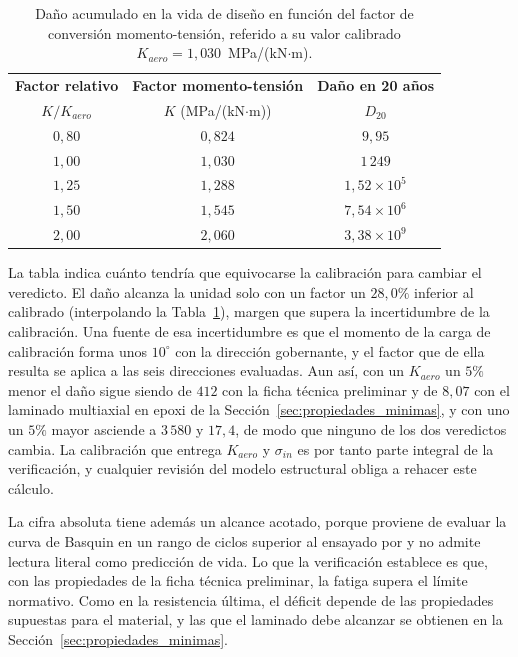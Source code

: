 \begin{table}[H]
    \centering
    \caption[Sensibilidad del daño acumulado a la calibración momento-tensión.]{Daño acumulado en la vida de diseño en función del factor de conversión momento-tensión, referido a su valor calibrado $K_{aero} = 1{,}030$~MPa/(kN$\cdot$m).}
    \label{tab:sensibilidad_fatiga}
    \begin{tabular}{ccc}
        \hline
        \textbf{Factor relativo} & \textbf{Factor momento-tensión} & \textbf{Daño en 20 años} \\
        $K/K_{aero}$ & $K$ (MPa/(kN$\cdot$m)) & $D_{20}$ \\
        \hline
        $0{,}80$ & $0{,}824$ & $9{,}95$ \\
        $1{,}00$ & $1{,}030$ & $1\,249$ \\
        $1{,}25$ & $1{,}288$ & $1{,}52 \times 10^{5}$ \\
        $1{,}50$ & $1{,}545$ & $7{,}54 \times 10^{6}$ \\
        $2{,}00$ & $2{,}060$ & $3{,}38 \times 10^{9}$ \\
        \hline
    \end{tabular}
\end{table}

La tabla indica cuánto tendría que equivocarse la calibración para cambiar el veredicto. El daño alcanza la unidad solo con un factor un $28{,}0\%$ inferior al calibrado (interpolando la Tabla~\ref{tab:sensibilidad_fatiga}), margen que supera la incertidumbre de la calibración. Una fuente de esa incertidumbre es que el momento de la carga de calibración forma unos $10^\circ$ con la dirección gobernante, y el factor que de ella resulta se aplica a las seis direcciones evaluadas. Aun así, con un $K_{aero}$ un $5\%$ menor el daño sigue siendo de $412$ con la ficha técnica preliminar y de $8{,}07$ con el laminado multiaxial en epoxi de la Sección~\ref{sec:propiedades_minimas}, y con uno un $5\%$ mayor asciende a $3\,580$ y $17{,}4$, de modo que ninguno de los dos veredictos cambia. La calibración que entrega $K_{aero}$ y $\sigma_{in}$ es por tanto parte integral de la verificación, y cualquier revisión del modelo estructural obliga a rehacer este cálculo.

La cifra absoluta tiene además un alcance acotado, porque proviene de evaluar la curva de Basquin en un rango de ciclos superior al ensayado por \textcite{Huh2012} y no admite lectura literal como predicción de vida. Lo que la verificación establece es que, con las propiedades de la ficha técnica preliminar, la fatiga supera el límite normativo. Como en la resistencia última, el déficit depende de las propiedades supuestas para el material, y las que el laminado debe alcanzar se obtienen en la Sección~\ref{sec:propiedades_minimas}.

